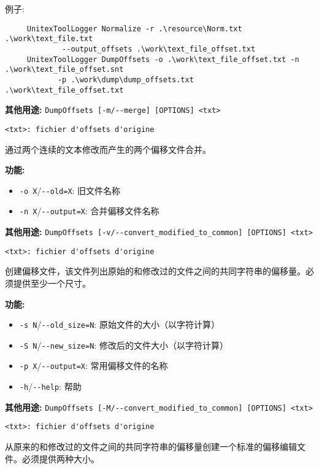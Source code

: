\noindent 例子: 
\begin{verbatim}
	 UnitexToolLogger Normalize -r .\resource\Norm.txt .\work\text_file.txt 	 
	         --output_offsets .\work\text_file_offset.txt 	 
	 UnitexToolLogger DumpOffsets -o .\work\text_file_offset.txt -n .\work\text_file_offset.snt 	 
	        -p .\work\dump\dump_offsets.txt .\work\text_file_offset.txt 	 
\end{verbatim}

\bigskip
\noindent \textbf{其他用途:} \verb+DumpOffsets [-m/--merge] [OPTIONS] <txt>+

\bigskip
\noindent \verb+<txt>: fichier d'offsets d'origine+

\bigskip
\noindent 通过两个连续的文本修改而产生的两个偏移文件合并。

\bigskip
\noindent \textbf{功能:}

\begin{itemize} 	 
  \item \verb+-o X+/\verb+--old=X+: 旧文件名称
  \item \verb+-n X+/\verb+--output=X+: 合并偏移文件名称
\end{itemize}

\bigskip
\noindent \textbf{其他用途:} \verb+DumpOffsets [-v/--convert_modified_to_common] [OPTIONS] <txt>+

\bigskip
\noindent \verb+<txt>: fichier d'offsets d'origine+

\bigskip
\noindent 创建偏移文件，该文件列出原始的和修改过的文件之间的共同字符串的偏移量。必须提供至少一个尺寸。	 

\bigskip
\noindent \textbf{功能:}
	  	 
\begin{itemize} 	 
  \item \verb+-s N+/\verb+--old_size=N+: 原始文件的大小（以字符计算）
  \item \verb+-S N+/\verb+--new_size=N+: 修改后的文件大小（以字符计算）
  \item \verb+-p X+/\verb+--output=X+: 常用偏移文件的名称	 
  \item \verb+-h+/\verb+--help+: 帮助
\end{itemize} 	 

\bigskip
\noindent \textbf{其他用途:} \verb+DumpOffsets [-M/--convert_modified_to_common] [OPTIONS] <txt>+

\bigskip
\noindent \verb+<txt>: fichier d'offsets d'origine+

\bigskip
\noindent 从原来的和修改过的文件之间的共同字符串的偏移量创建一个标准的偏移编辑文件。必须提供两种大小。
	
